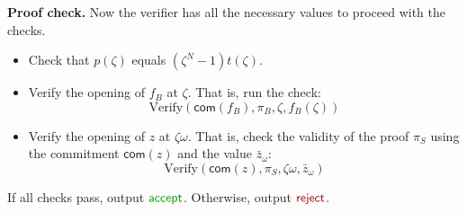 \documentclass[../lecture-notes.tex]{subfiles}
\begin{document}
\textcolor{blue!60!black}{\textbf{Proof check.}} Now the verifier has all the
necessary values to proceed with the checks.
\begin{itemize}
    \item Check that $p(\zeta)$ equals $(\zeta^N - 1)t(\zeta)$.
    \item Verify the opening of $f_{B}$ at $\zeta$. That is, run the check:
        \begin{equation*}
            \text{Verify}(\mathsf{com}(f_{B}), \pi_{B}, \zeta, f_{B}(\zeta))
        \end{equation*}
    \item Verify the opening of $z$ at $\zeta\omega$. That is, check the
    validity of the proof $\pi_{S}$ using the commitment $\mathsf{com}(z)$ and the
    value $\bar{z}_{\omega}$:
        \begin{equation*}
            \text{Verify}(\mathsf{com}(z), \pi_{S}, \zeta\omega, \bar{z}_{\omega})
        \end{equation*}
\end{itemize}

If all checks pass, output $\textcolor{green!60!black}{\mathsf{accept}}$.
Otherwise, output $\textcolor{red!60!black}{\mathsf{reject}}$.
\end{document}
